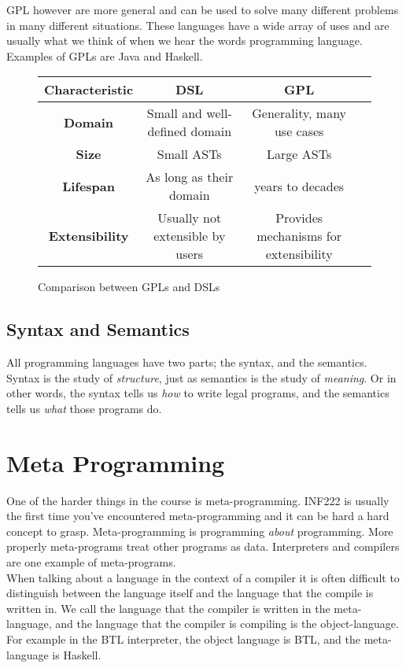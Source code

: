     \Gls{GPL} however are more general and can be used to solve many different problems in many different situations.
    These languages have a wide array
    of uses and are usually what we think of when we hear the words programming language. Examples of GPLs are Java and Haskell.\\
    
    \begin{figure*}[!h]
        \centering
        \begin{tabular}{|c|c|c|c|}
            \hline
            \textbf{Characteristic} &\textbf{DSL } &\textbf{GPL}\\
            \hline
            \textbf{Domain} & Small and well-defined domain & Generality, many use cases\\
            \hline
            \textbf{Size} &Small ASTs & Large ASTs\\
            \hline
            \textbf{Lifespan} &As long as their domain &years to decades\\
            \hline
            \textbf{Extensibility} &Usually not extensible by users & Provides mechanisms for extensibility\\
            \hline
        \end{tabular}%
        \caption{Comparison between GPLs and DSLs}
    \end{figure*}%



    \subsection*{Syntax and Semantics}
    All programming languages have two parts; the \gls{syntax}, and the \gls{semantics}.\\
    Syntax is the study of \textit{structure}, just as semantics is the study of \textit{meaning}. 
    Or in other words, the syntax tells us \textit{how} to write legal programs, and the semantics tells us \textit{what} those programs do. 

    \section{Meta Programming}
    One of the harder things in the course is \gls{meta-programming}. INF222 is usually the first time you've encountered meta-programming and it can be hard a hard concept to grasp. 
    Meta-programming is programming \textit{about} programming. More properly meta-programs treat other programs as data. 
    Interpreters and compilers are one example of meta-programs.\\
    When talking about a language in the context of a compiler it is often difficult to distinguish between the language itself and the language that the compile is written in.
    We call the language that the compiler is written in the \gls{meta-language}, and the language that the compiler is compiling is the \gls{object-language}.\\
    For example in the BTL interpreter, the object language is BTL, and the meta-language is Haskell.\\

